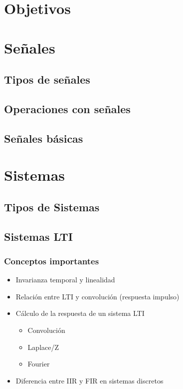 \documentclass{beamer}
\begin{document}
  \portada
  \section{Objetivos}
  \section{Señales}
    \subsection{Tipos de señales}
    \subsection{Operaciones con señales}
    \subsection{Señales básicas}
  \section{Sistemas}
    \subsection{Tipos de Sistemas}
      
    \subsection{Sistemas LTI}
      
    \begin{frame}\frametitle{Conceptos importantes}
      \begin{itemize}
        \item \alert{Invarianza temporal y linealidad}
        \item \alert{Relación entre LTI y convolución (respuesta impulso)}
        \item \alert{Cálculo de la respuesta de un sistema LTI}
        \begin{itemize}
          \item Convolución
          \item Laplace/Z
          \item Fourier
        \end{itemize}
        \item \alert{Diferencia entre IIR y FIR en sistemas discretos}
      \end{itemize}
    \end{frame}
\end{document}
